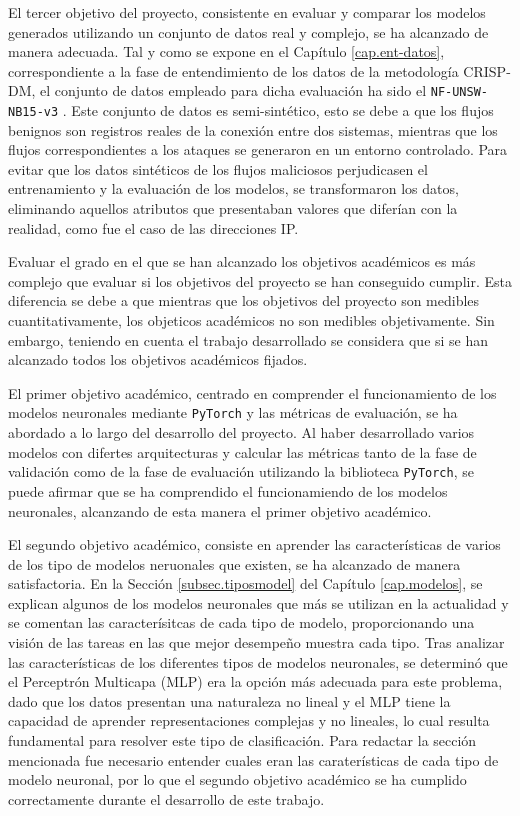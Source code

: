 El tercer objetivo del proyecto, consistente en evaluar y comparar los modelos generados utilizando un conjunto de datos real y complejo, se ha alcanzado de manera adecuada. Tal y como se expone en el Capítulo \ref{cap.ent-datos}, correspondiente a la fase de entendimiento de los datos de la metodología CRISP-DM, el conjunto de datos empleado para dicha evaluación ha sido el \texttt{NF-UNSW-NB15-v3} \cite{luay2025NetFlowDatasetsV3}. Este conjunto de datos es semi-sintético, esto se debe a que los flujos benignos son registros reales de la conexión entre dos sistemas, mientras que los flujos correspondientes a los ataques se generaron en un entorno controlado. Para evitar que los datos sintéticos de los flujos maliciosos perjudicasen el entrenamiento y la evaluación de los modelos, se transformaron los datos, eliminando aquellos atributos que presentaban valores que diferían con la realidad, como fue el caso de las direcciones IP.

Evaluar el grado en el que se han alcanzado los objetivos académicos es más complejo que evaluar si los objetivos del proyecto se han conseguido cumplir. Esta diferencia se debe a que mientras que los objetivos del proyecto son medibles cuantitativamente, los objeticos académicos no son medibles objetivamente. Sin embargo, teniendo en cuenta el trabajo desarrollado se considera que si se han alcanzado todos los objetivos académicos fijados.

El primer objetivo académico, centrado en comprender el funcionamiento de los modelos neuronales mediante \texttt{PyTorch} y las métricas de evaluación, se ha abordado a lo largo del desarrollo del proyecto. Al haber desarrollado varios modelos con difertes arquitecturas y calcular las métricas tanto de la fase de validación como de la fase de evaluación utilizando la biblioteca \texttt{PyTorch}, se puede afirmar que se ha comprendido el funcionamiendo de los modelos neuronales, alcanzando de esta manera el primer objetivo académico.

El segundo objetivo académico, consiste en aprender las características de varios de los tipo de modelos neruonales que existen, se ha alcanzado de manera satisfactoria. En la Sección \ref{subsec.tiposmodel} del Capítulo \ref{cap.modelos}, se explican algunos de los modelos neuronales que más se utilizan en la actualidad y se comentan las caracterísitcas de cada tipo de modelo, proporcionando una visión de las tareas en las que mejor desempeño muestra cada tipo. Tras analizar las características de los diferentes tipos de modelos neuronales, se determinó que el Perceptrón Multicapa (MLP) era la opción más adecuada para este problema, dado que los datos presentan una naturaleza no lineal y el MLP tiene la capacidad de aprender representaciones complejas y no lineales, lo cual resulta fundamental para resolver este tipo de clasificación. Para redactar la sección mencionada fue necesario entender cuales eran las caraterísticas de cada tipo de modelo neuronal, por lo que el segundo objetivo académico se ha cumplido correctamente durante el desarrollo de este trabajo.

